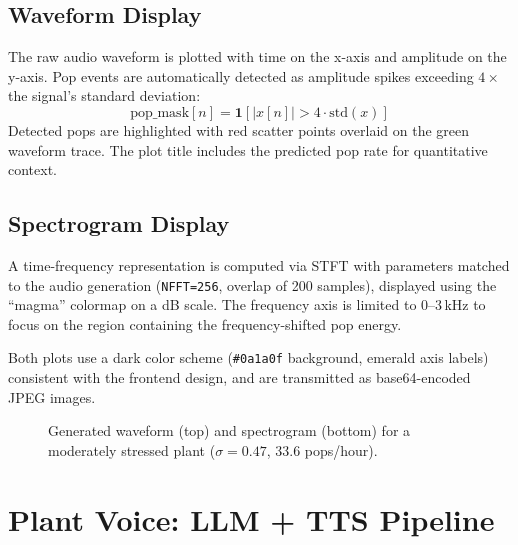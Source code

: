 \documentclass[11pt,a4paper,twocolumn]{article}
\begin{document}
\subsection{Waveform Display}

The raw audio waveform is plotted with time on the x-axis and amplitude on the y-axis. Pop events are automatically detected as amplitude spikes exceeding $4\times$ the signal's standard deviation:
\begin{equation}
    \text{pop\_mask}[n] = \mathbf{1}\left[ |x[n]| > 4 \cdot \text{std}(x) \right]
\end{equation}
Detected pops are highlighted with red scatter points overlaid on the green waveform trace. The plot title includes the predicted pop rate for quantitative context.

\subsection{Spectrogram Display}

A time-frequency representation is computed via STFT with parameters matched to the audio generation (\texttt{NFFT=256}, overlap of 200 samples), displayed using the ``magma'' colormap on a dB scale. The frequency axis is limited to 0--3\,kHz to focus on the region containing the frequency-shifted pop energy.

Both plots use a dark color scheme (\texttt{\#0a1a0f} background, emerald axis labels) consistent with the frontend design, and are transmitted as base64-encoded JPEG images.

\begin{figure}[H]
    \centering
    \caption{Generated waveform (top) and spectrogram (bottom) for a moderately stressed plant ($\sigma = 0.47$, 33.6 pops/hour).}
    \label{fig:waveform_spec}
\end{figure}


\section{Plant Voice: LLM + TTS Pipeline}
\label{sec:voice}
\end{document}
